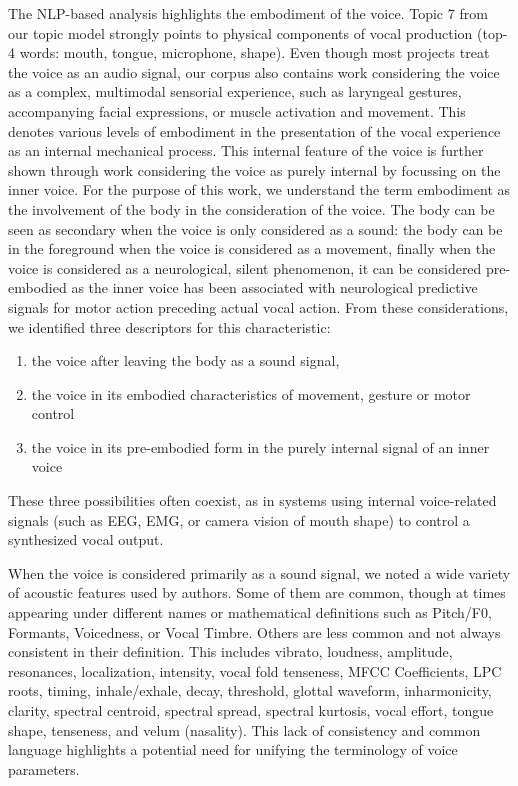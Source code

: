 \documentclass[sigconf]{nimeart}
\begin{document}
The NLP-based analysis highlights the embodiment of the voice. Topic 7 from our topic model strongly points to physical components of vocal production (top-4 words: mouth, tongue, microphone, shape). Even though most projects treat the voice as an audio signal, our corpus also contains work considering the voice as a complex, multimodal sensorial experience, such as laryngeal gestures, accompanying facial expressions, or muscle activation and movement. This denotes various levels of embodiment in the presentation of the vocal experience as an internal mechanical process. This internal feature of the voice is further shown through work considering the voice as purely internal by focussing on the inner voice. For the purpose of this work, we understand the term embodiment as the involvement of the body in the consideration of the voice. The body can be seen as secondary when the voice is only considered as a sound: the body can be in the foreground when the voice is considered as a movement, finally when the voice is considered as a neurological, silent phenomenon, it can be considered pre-embodied as the inner voice has been associated with neurological predictive signals for motor action preceding actual vocal action. From these considerations, we identified three descriptors for this characteristic:

\begin{enumerate}
\item
  the voice after leaving the body as a sound signal,~
\item
  the voice in its embodied characteristics of movement, gesture or motor control
\item
  the voice in its pre-embodied form in the purely internal signal of an inner voice~
\end{enumerate}

These three possibilities often coexist, as in systems using internal voice-related signals (such as EEG, EMG, or camera vision of mouth shape) to control a synthesized vocal output.

When the voice is considered primarily as a sound signal, we noted a wide variety of acoustic features used by authors. Some of them are common, though at times appearing under different names or mathematical definitions such as Pitch/F0, Formants, Voicedness, or Vocal Timbre. Others are less common and not always consistent in their definition. This includes vibrato, loudness, amplitude, resonances, localization, intensity, vocal fold tenseness, MFCC Coefficients, LPC roots, timing, inhale/exhale, decay, threshold, glottal waveform, inharmonicity, clarity, spectral centroid, spectral spread, spectral kurtosis, vocal effort, tongue shape, tenseness, and velum (nasality). This lack of consistency and common language highlights a potential need for unifying the terminology of voice parameters.
\end{document}
